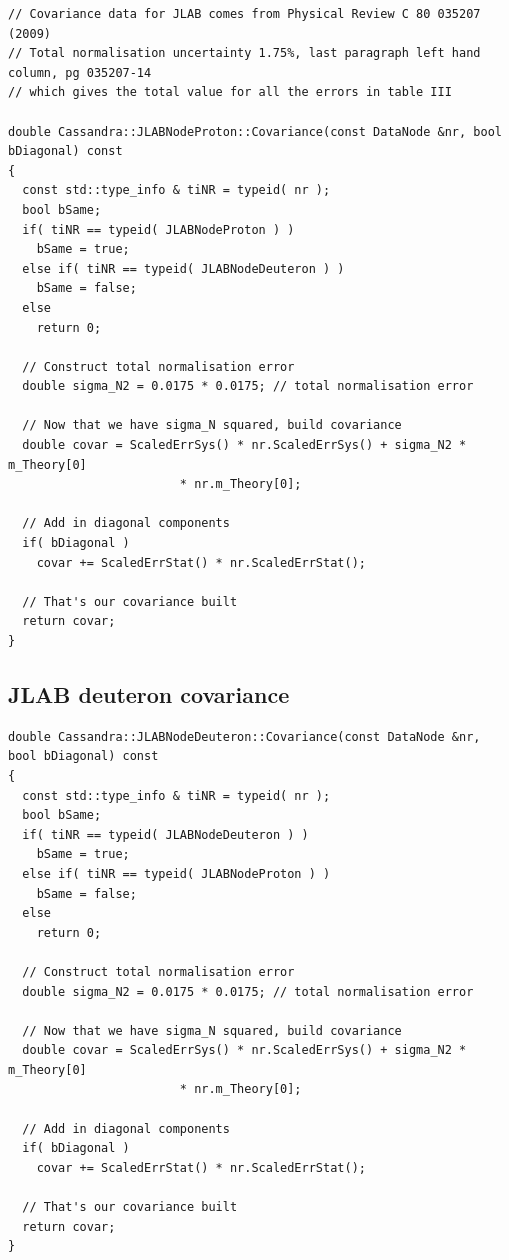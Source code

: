 \documentclass[12pt,a4paper]{report}
\begin{document}
\begin{Verbatim}[fontsize=\small]
// Covariance data for JLAB comes from Physical Review C 80 035207 (2009)
// Total normalisation uncertainty 1.75%, last paragraph left hand column, pg 035207-14
// which gives the total value for all the errors in table III

double Cassandra::JLABNodeProton::Covariance(const DataNode &nr, bool bDiagonal) const
{
  const std::type_info & tiNR = typeid( nr );
  bool bSame;
  if( tiNR == typeid( JLABNodeProton ) )
    bSame = true;
  else if( tiNR == typeid( JLABNodeDeuteron ) )
    bSame = false;
  else
    return 0;

  // Construct total normalisation error
  double sigma_N2 = 0.0175 * 0.0175; // total normalisation error

  // Now that we have sigma_N squared, build covariance
  double covar = ScaledErrSys() * nr.ScaledErrSys() + sigma_N2 * m_Theory[0]
                        * nr.m_Theory[0];

  // Add in diagonal components
  if( bDiagonal )
    covar += ScaledErrStat() * nr.ScaledErrStat();

  // That's our covariance built
  return covar;
}
\end{Verbatim}

\subsection{JLAB deuteron \cite{JLAB} covariance}

\begin{Verbatim}[fontsize=\small]
double Cassandra::JLABNodeDeuteron::Covariance(const DataNode &nr, bool bDiagonal) const
{
  const std::type_info & tiNR = typeid( nr );
  bool bSame;
  if( tiNR == typeid( JLABNodeDeuteron ) )
    bSame = true;
  else if( tiNR == typeid( JLABNodeProton ) )
    bSame = false;
  else
    return 0;

  // Construct total normalisation error
  double sigma_N2 = 0.0175 * 0.0175; // total normalisation error

  // Now that we have sigma_N squared, build covariance
  double covar = ScaledErrSys() * nr.ScaledErrSys() + sigma_N2 * m_Theory[0]
                        * nr.m_Theory[0];

  // Add in diagonal components
  if( bDiagonal )
    covar += ScaledErrStat() * nr.ScaledErrStat();

  // That's our covariance built
  return covar;
}
\end{Verbatim}
\end{document}
